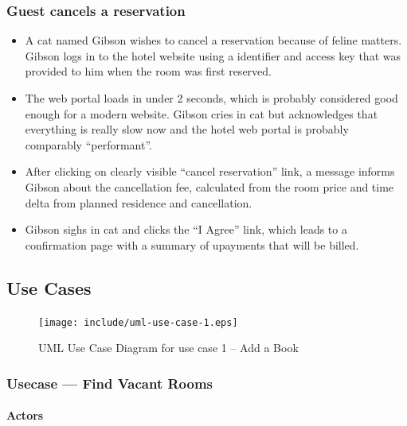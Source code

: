 \subsubsection{Guest cancels a reservation}\label{scenario3}
% 
% 
% 
\begin{itemize}
  \item A cat named Gibson wishes to cancel a reservation because of feline
      matters.  Gibson logs in to the hotel website using a identifier and
        access key that was provided to him when the room was first reserved.

  \item The web portal loads in under 2 seconds, which is probably considered good
        enough for a modern website. Gibson cries in cat but acknowledges that
        everything is really slow now and the hotel web portal is probably
        comparably ``performant''.

  \item After clicking on clearly visible ``cancel reservation'' link, a
      message informs Gibson about the cancellation fee, calculated from the
        room price and time delta from planned residence and cancellation.
      
  \item Gibson sighs in cat and clicks the ``I Agree'' link, which leads to a
      confirmation page with a summary of upayments that will be billed.
\end{itemize}




\subsection{Use Cases}

\begin{figure}[htbp]
  \centering
  \texttt{[image: include/uml-use-case-1.eps]}
  \caption{UML Use Case Diagram for use case 1 -- Add a Book}
  \label{fig:uml-usecase1}
\end{figure}

\subsubsection{Usecase --- Find Vacant Rooms}\label{usecase1}

\paragraph{Actors}

